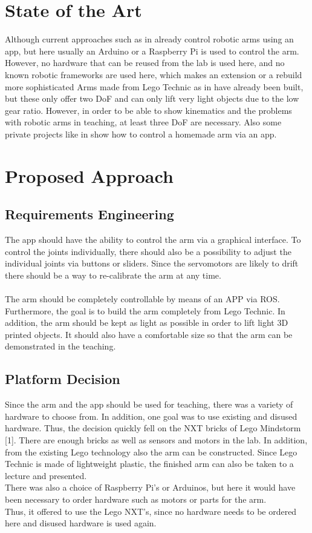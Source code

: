 \documentclass[conference]{IEEEtran}
\begin{document}
\section{State of the Art}
Although current approaches such as in \cite{onlIEEEApp-Arm} already control robotic arms using an app, but here usually an Arduino or a Raspberry Pi is used to control the arm. However, no hardware that can be reused from the lab is used here, and no known robotic frameworks are used here, which makes an extension or a rebuild more sophisticated Arms made from Lego Technic as in \cite{onlNXT-2DOF} have already been built, but these only offer two DoF and can only lift very light objects due to the low gear ratio. However, in order to be able to show kinematics and the problems with robotic arms in teaching, at least three DoF are necessary.
Also some private projects like in \cite{onlHackster} show how to control a homemade arm via an app.
\section{Proposed Approach}\label{sec:approach}

\subsection{Requirements Engineering}\label{sec:requirements}
The app should have the ability to control the arm via a graphical interface. To control the joints individually, there should also be a possibility to adjust the individual joints via buttons or sliders. Since the servomotors are likely to drift there should be a way to re-calibrate the arm at any time.
\\\\
The arm should be completely controllable by means of an APP via ROS. Furthermore, the goal is to build the arm completely from Lego Technic. In addition, the arm should be kept as light as possible in order to lift light 3D printed objects. It should also have a comfortable size so that the arm can be demonstrated in the teaching.

\subsection{Platform Decision}\label{sec:platform}
Since the arm and the app should be used for teaching, there was a variety of hardware to choose from. In addition, one goal was to use existing and disused hardware. Thus, the decision quickly fell on the NXT bricks of Lego Mindstorm [1]. There are enough bricks as well as sensors and motors in the lab. In addition, from the existing Lego technology also the arm can be constructed. Since Lego Technic is made of lightweight plastic, the finished arm can also be taken to a lecture and presented.\\
There was also a choice of Raspberry Pi's or Arduinos, but here it would have been necessary to order hardware such as motors or parts for the arm.\\
Thus, it offered to use the Lego NXT's, since no hardware needs to be ordered here and disused hardware is used again.
\end{document}
